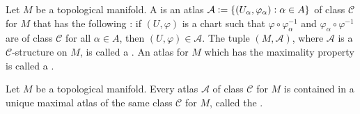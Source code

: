 \begin{definition}
	Let $M$ be a topological manifold. A  is an atlas $\mathcal{A} := \cbr[0]{(U_\alpha,\varphi_\alpha) : \alpha \in A}$ of class $\mathscr{C}$ for $M$ that has the following : if $(U,\varphi)$ is a chart such that $\varphi \circ \varphi_\alpha^{-1}$ and $\varphi_\alpha \circ \varphi^{-1}$ are of class $\mathscr{C}$ for all $\alpha \in A$, then $(U,\varphi) \in \mathcal{A}$. The tuple $(M,\mathcal{A})$, where $\mathcal{A}$ is a $\mathscr{C}$-structure on $M$, is called a . An atlas for $M$ which has the maximality property is called a .
\end{definition}

\begin{proposition}
	Let $M$ be a topological manifold. Every atlas $\mathcal{A}$ of class $\mathscr{C}$ for $M$ is contained in a unique maximal atlas of the same class $\mathscr{C}$ for $M$, called the . 
\end{proposition}

